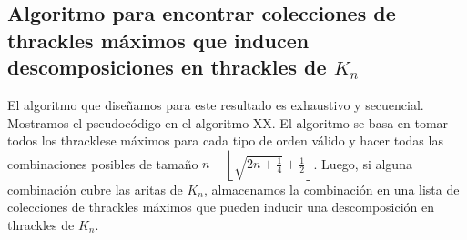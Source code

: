 \subsection{Algoritmo para encontrar colecciones de thrackles máximos que
inducen descomposiciones en thrackles de $K_n$}
  El algoritmo que diseñamos para este resultado es exhaustivo y secuencial.
  Mostramos el pseudocódigo en el algoritmo XX. %
  El algoritmo se basa en tomar todos los thracklese máximos para cada tipo de
  orden válido y hacer todas las combinaciones posibles de tamaño $n -
  \left\lfloor\sqrt{2n+\frac{1}{4}} + \frac{1}{2}\right\rfloor$. Luego, si
  alguna combinación cubre las aritas de $K_n$, almacenamos la combinación en
  una lista de colecciones de thrackles máximos que pueden inducir una
  descomposición en thrackles de $K_n$.
